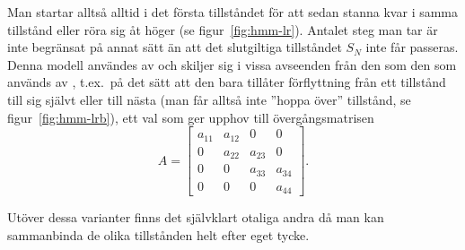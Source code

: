 \documentclass[../rapport_MVEX01-11-05]{subfiles}
\begin{document}
Man startar alltså alltid i det första tillståndet för att sedan
stanna kvar i samma tillstånd eller röra sig åt höger (se
figur~\ref{fig:hmm-lr}). Antalet steg
man tar är inte begränsat på annat sätt än att det slutgiltiga
tillståndet $S_N$ inte får passeras. Denna modell användes av
 och skiljer sig i vissa avseenden från
den som den som används av , t.ex.~på det sätt att
den bara tillåter förflyttning från
ett tillstånd till sig självt eller till nästa (man får alltså inte ''hoppa
över'' tillstånd, se figur~\ref{fig:hmm-lrb}), ett val som ger upphov
till övergångsmatrisen
\begin{equation*}
A = \begin{bmatrix}
a_{11} & a_{12} & 0 & 0\\
0 & a_{22} & a_{23} & 0\\
0 & 0 & a_{33} & a_{34}\\
0 & 0 & 0 & a_{44}
\end{bmatrix}.  
\end{equation*} 

Utöver dessa varianter finns det självklart otaliga andra då man kan
sammanbinda de olika tillstånden helt efter eget tycke.

\end{document}

